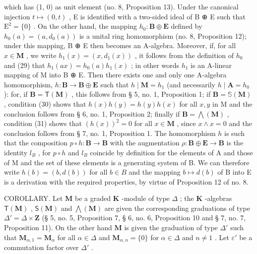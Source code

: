 which has (1, 0) as unit element (no. 8, Proposition 13). Under the canonical injection \(t \mapsto (0, t)\) , E is identified with a two-sided ideal of B ⊕ E such that \(\mathrm{E}^2 = \{0\}\) . On the other hand, the mapping \(h_0 \colon \mathbf{B} \oplus \mathbf{E}\) defined by \(h_0(a) = (a, d_0(a))\) is a unital ring homomorphism (no. 8, Proposition 12); under this mapping, B ⊕ E then becomes an A-algebra. Moreover, if, for all \(x \in \mathbf{M}\) , we write \(h_1(x) = (x, d_1(x))\) , it follows from the definition of \(h_0\) and (29) that \(h_1(ax) = h_0(a)h_1(x)\) ; in other words \(h_1\) is an A-linear mapping of M into B ⊕ E. Then there exists one and only one A-algebra homomorphism, \(h \colon \mathbf{B} \to \mathbf{B} \oplus \mathbf{E}\) such that \(h \mid \mathbf{M} = h_1\) (and necessarily \(h \mid \mathbf{A} = h_0\) ): for, if \(\mathbf{B} = \mathsf{T}(\mathbf{M})\) , this follows from § 5, no. 1, Proposition 1; if \(\mathbf{B} = \mathbb{S}(\mathbf{M})\) , condition (30) shows that \(h(x)h(y) = h(y)h(x)\) for all \(x, y\) in M and the conclusion follows from § 6, no. 1, Proposition 2; finally if \(\mathbf{B} = \bigwedge (\mathbf{M})\) , condition (31) shows that \((h(x))^2 = 0\) for all \(x \in \mathbf{M}\) , since \(x \wedge x = 0\) and the conclusion follows from § 7, no. 1, Proposition 1. The homomorphism \(h\) is such that the composition \(p \circ h \colon \mathbf{B} \to \mathbf{B}\) with the augmentation \(\rho \colon \mathbf{B} \oplus \mathbf{E} \to \mathbf{B}\) is the identity \(l_B\) , for \(p \circ h\) and \(l_B\) coincide by definition for the elements of A and those of M and the set of these elements is a generating system of B. We can therefore write \(h(b) = (b, d(b))\) for all \(b \in B\) and the mapping \(b \mapsto d(b)\) of B into E is a derivation with the required properties, by virtue of Proposition 12 of no. 8.

COROLLARY. Let \(\mathbf{M}\) be a graded \(\mathbf{K}\) -module of type \(\Delta\) ; the \(\mathbf{K}\) -algebras \(\mathsf{T}(\mathbf{M})\) , \(\mathsf{S}(\mathbf{M})\) and \(\bigwedge (\mathbf{M})\) are given the corresponding graduations of type \(\Delta' = \Delta \times \mathbf{Z}\) (§ 5, no. 5, Proposition 7, § 6, no. 6, Proposition 10 and § 7, no. 7, Proposition 11). On the other hand \(\mathbf{M}\) is given the graduation of type \(\Delta'\) such that \(\mathbf{M}_{\alpha,1} = \mathbf{M}_{\alpha}\) for all \(\alpha \in \Delta\) and \(\mathbf{M}_{\alpha,n} = \{0\}\) for \(\alpha \in \Delta\) and \(n \neq 1\) . Let \(\varepsilon'\) be a commutation factor over \(\Delta'\) .

